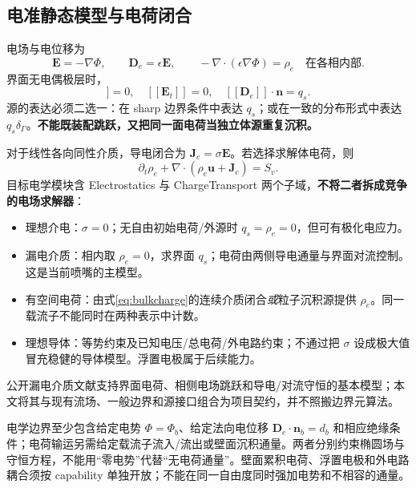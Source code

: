 \documentclass[UTF8,a4paper,11pt,fontset=fandol]{ctexart}
\numberwithin{equation}{section}
\newcommand{\uu}{\bm u}
\newcommand{\nn}{\bm n}
\newcommand{\EE}{\bm E}
\newcommand{\JJ}{\bm J}
\newcommand{\jump}[1]{[\![#1]\!]}
\begin{document}
\subsection{电准静态模型与电荷闭合}\label{sec:elecmodel}
电场与电位移为
\begin{equation}
 \EE=-\nabla\Phi,\qquad \bm D_e=\epsilon\EE,\qquad
 -\nabla\cdot(\epsilon\nabla\Phi)=\rho_e\quad\text{在各相内部}.
\end{equation}
界面无电偶极层时，
\begin{equation}
 \jump\Phi=0,\quad \jump{\EE_t}=0,\quad
 \jump{\bm D_e}\cdot\nn=q_s.\label{eq:gaussjump}
\end{equation}
源的表达必须二选一：在 sharp 边界条件中表达 $q_s$；或在一致的分布形式中表达 $q_s\delta_\Gamma$。\textbf{不能既装配跳跃，又把同一面电荷当独立体源重复沉积。}

对于线性各向同性介质，导电闭合为 $\JJ_c=\sigma\EE$。若选择求解体电荷，则
\begin{equation}
 \partial_t\rho_e+\nabla\cdot(\rho_e\uu+\JJ_c)=S_v.\label{eq:bulkcharge}
\end{equation}
目标电学模块含 Electrostatics 与 ChargeTransport 两个子域，\textbf{不将二者拆成竞争的电场求解器}：
\begin{itemize}
\item 理想介电：$\sigma=0$；无自由初始电荷/外源时 $q_s=\rho_e=0$，但可有极化电应力。
\item 漏电介质：相内取 $\rho_e=0$，求界面 $q_s$；电荷由两侧导电通量与界面对流控制。这是当前喷嘴的主模型。
\item 有空间电荷：由式\eqref{eq:bulkcharge}的连续介质闭合\emph{或}粒子沉积源提供 $\rho_e$。同一载流子不能同时在两种表示中计数。
\item 理想导体：等势约束及已知电压/总电荷/外电路约束；不通过把 $\sigma$ 设成极大值冒充稳健的导体模型。浮置电极属于后续能力。
\end{itemize}
公开漏电介质文献支持界面电荷、相侧电场跳跃和导电/对流守恒的基本模型\cite{das}；本文将其与现有流场、一般边界和源接口组合为项目契约，并不照搬边界元算法。

电学边界至少包含给定电势 $\Phi=\Phi_b$、给定法向电位移 $\bm D_e\cdot\nn_b=d_b$ 和相应绝缘条件；电荷输运另需给定载流子流入/流出或壁面沉积通量。两者分别约束椭圆场与守恒方程，不能用“零电势”代替“无电荷通量”。壁面累积电荷、浮置电极和外电路耦合须按 capability 单独开放；不能在同一自由度同时强加电势和不相容的通量。
\end{document}
